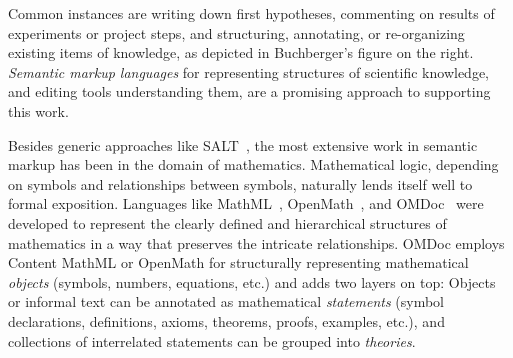 \begin{figure}
  \centering
  \vspace{-1.0cm}
  \vspace{-1.5cm}
\end{figure}
\begin{motivation}
  Common instances are writing down first hypotheses, commenting on
results of experiments or project steps, and structuring, annotating, or
re-organizing existing items of knowledge, as depicted in Buchberger's figure on
the right.  \emph{Semantic markup languages} for
representing structures of scientific knowledge, and editing tools understanding
them, are a promising approach to supporting this work.\end{motivation}  \begin{background}Besides generic approaches like SALT~\cite{Groza:SALT07}, the most extensive
work in semantic markup has been in the domain of mathematics.  Mathematical
logic, depending on symbols and relationships between symbols, naturally lends
itself well to formal exposition.
Languages like MathML~\cite{CarlisleEd:MathML07},
OpenMath~\cite{BusCapCar:2oms04}, and OMDoc~\cite{Kohlhase:omdoc1.2} were
developed to represent the clearly defined and hierarchical structures of
mathematics in a way that preserves the intricate relationships.  OMDoc employs
Content MathML or OpenMath for structurally representing mathematical
\emph{objects} (symbols, numbers, equations, etc.) and adds two layers on top:
Objects or informal text can be annotated as mathematical \emph{statements}
(symbol declarations, definitions, axioms, theorems, proofs, examples, etc.),
and collections of interrelated statements can be grouped into \emph{theories}.\end{background}


